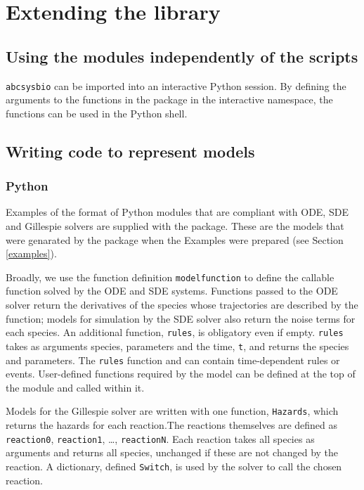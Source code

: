\documentclass[a4paper]{report}
\begin{document}
\chapter{Extending the library}
\label{extending}
\section{Using the modules independently of the scripts}
\verb$abcsysbio$ can be imported into an interactive Python session. By defining the arguments to the functions in the package in the interactive namespace, the functions can be used in the Python shell.
\section{Writing code to represent models}
\label{extending}
\subsection{Python}
Examples of the format of Python modules that are compliant with ODE, SDE and Gillespie solvers are supplied with the package. These are the models that were genarated by the package when the Examples were prepared (see Section \ref{examples}).

Broadly, we use the function definition \verb$modelfunction$ to define the callable function solved by the ODE and SDE systems. Functions passed to the ODE solver return the derivatives of the species whose trajectories are described by the function; models for simulation by the SDE solver also return the noise terms for each species. An additional function, \verb$rules$, is obligatory even if empty. \verb$rules$ takes as arguments species, parameters and the time, \verb$t$, and returns the species and parameters. The \verb$rules$ function and can contain time-dependent rules or events. User-defined functions required by the model can be defined at the top of the module and called within it.

Models for the Gillespie solver are written with one function, \verb$Hazards$, which returns the hazards for each reaction.The reactions themselves are defined as \verb$reaction0$, \verb$reaction1$, \dots, \verb$reactionN$. Each reaction takes all species as arguments and returns all species, unchanged if these are not changed by the reaction.  A dictionary, defined \verb$Switch$, is used by the solver to call the chosen reaction. 

\end{document}

